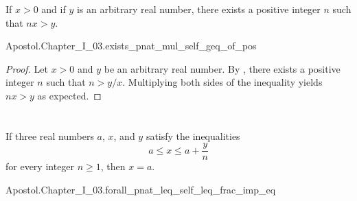 \documentclass{report}
\begin{document}
  \begin{theorem}[I.30]
    If $x > 0$ and if $y$ is an arbitrary real number, there exists a positive
      integer $n$ such that $nx > y$.
  \end{theorem}

    {Apostol.Chapter\_I\_03.exists\_pnat\_mul\_self\_geq\_of\_pos}

  \begin{proof}
    Let $x > 0$ and $y$ be an arbitrary real number.
    By , there exists a positive integer $n$ such that
      $n > y / x$.
    Multiplying both sides of the inequality yields $nx > y$ as expected.
  \end{proof}

\section{}%

  \begin{theorem}[I.31]
    If three real numbers $a$, $x$, and $y$ satisfy the inequalities
      $$a \leq x \leq a + \frac{y}{n}$$ for every integer $n \geq 1$, then
      $x = a$.
  \end{theorem}

    {Apostol.Chapter\_I\_03.forall\_pnat\_leq\_self\_leq\_frac\_imp\_eq}
\end{document}
